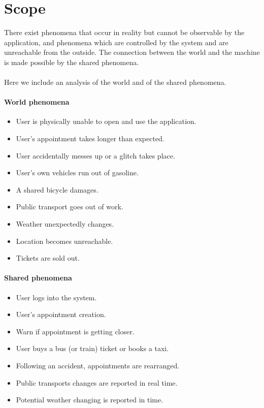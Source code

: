 \section{Scope}
\label{sec:scope}
There exist phenomena that occur in reality but cannot be observable by the application, and phenomena which are controlled by the system and are unreachable from the outside. The connection between the world and the machine is made possible by the shared phenomena. \\\\
Here we include an analysis of the world and of the shared phenomena.
\paragraph{World phenomena}
\begin{itemize}
\item User is physically unable to open and use the application.
\item User's appointment takes longer than expected.
\item User accidentally messes up or a glitch takes place. 
\item User's own vehicles run out of gasoline.
\item A shared bicycle damages.
\item Public transport goes out of work.
\item Weather unexpectedly changes.
\item Location becomes unreachable.
\item Tickets are sold out.
\end{itemize}
\paragraph{Shared phenomena}
\begin{itemize}
\item User logs into the system.
\item User's appointment creation.
\item Warn if appointment is getting closer.
\item User buys a bus (or train) ticket or books a taxi.
\item Following an accident, appointments are rearranged.
\item Public transports changes are reported in real time.
\item Potential weather changing is reported in time.
\end{itemize}
